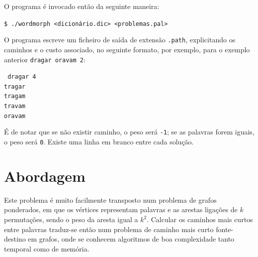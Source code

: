 \documentclass[portuguese, a4paper]{article}
\begin{document}
	\par
	O programa é invocado então da seguinte maneira:
	\begin{center}
		\texttt{\$ ./wordmorph <dicionário.dic> <problemas.pal>}
	\end{center}
	\par
	O programa escreve um ficheiro de saída de extensão \texttt{.path},
	explicitando os caminhos e o custo associado, no seguinte formato, por
	exemplo, para o exemplo anterior \texttt{dragar oravam 2}:
	\begin{center}
		\texttt{
		dragar 4\\
		tragar \\
		tragam \\
		travam \\
		oravam}
	\end{center}
	\par
	É de notar que se não existir caminho, o peso será \texttt{-1}; se as
	palavras forem iguais, o peso será \texttt{0}. Existe uma linha em branco
	entre cada solução.


\section{Abordagem}
	\par
	Este problema é muito facilmente transposto num problema de grafos
	ponderados, em que os vértices representam palavras e as arestas ligações
	de $k$ permutações, sendo o peso da aresta igual a $k^2$.  Calcular os
	caminhos mais curtos entre palavras traduz-se então num problema de caminho
	mais curto fonte-destino em grafos, onde se conhecem algoritmos de boa
	complexidade tanto temporal como de memória.
\end{document}
